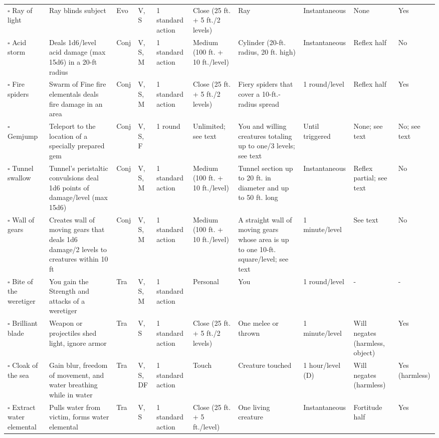 \documentclass[12pt, a4paper]{article}
\begin{document}
\begin{center}
\begin{longtable}[H]{ p{8em} p{15em} p{2em} p{5em} p{6em} p{6em} p{10em} p{6em} p{5em} p{2em} }
    \(\square\) Ray of light & Ray blinds subject & Evo & V, S & 1 standard action & Close (25 ft. + 5 ft./2 levels) & Ray & Instantaneous & None & Yes\\
    \(\square\) Acid storm & Deals 1d6/level acid damage (max 15d6) in a 20-ft radius & Conj & V, S, M & 1 standard action & Medium (100 ft. + 10 ft./level) & Cylinder (20-ft. radius, 20 ft. high) & Instantaneous & Reﬂex half & No\\
    \(\square\) Fire spiders & Swarm of Fine ﬁre elementals deals ﬁre damage in an area & Conj & V, S, M & 1 standard action & Close (25 ft. + 5 ft./2 levels) & Fiery spiders that cover a 10-ft.-radius spread & 1 round/level & Reﬂex half & Yes\\
    \(\square\) Gemjump & Teleport to the location of a specially prepared gem & Conj & V, S, F & 1 round & Unlimited; see text & You and willing creatures totaling up to one/3 levels; see text & Until triggered & None; see text & No; see text\\
    \(\square\) Tunnel swallow & Tunnel’s peristaltic convulsions deal 1d6 points of damage/level (max 15d6) & Conj & V, S, M & 1 standard action & Medium (100 ft. + 10 ft./level) & Tunnel section up to 20 ft. in diameter and up to 50 ft. long & Instantaneous & Reﬂex partial; see text & No\\
    \(\square\) Wall of gears & Creates wall of moving gears that deals 1d6 damage/2 levels to creatures within 10 ft & Conj & V, S, M & 1 standard action & Medium (100 ft. + 10 ft./level) & A straight wall of moving gears whose area is up to one 10-ft. square/level; see text & 1 minute/level & See text & No\\
    \(\square\) Bite of the weretiger & You gain the Strength and attacks of a weretiger & Tra & V, S, M & 1 standard action & Personal & You & 1 round/level & - & -\\
    \(\square\) Brilliant blade & Weapon or projectiles shed light, ignore armor & Tra & V, S & 1 standard action & Close (25 ft. + 5 ft./2 levels) & One melee or thrown  & 1 minute/level & Will negates (harmless, object) & Yes \\
    \(\square\) Cloak of the sea & Gain blur, freedom of movement, and water breathing while in water & Tra & V, S, DF & 1 standard action & Touch & Creature touched & 1 hour/level (D) & Will negates (harmless) & Yes (harmless)\\
    \(\square\) Extract water elemental & Pulls water from victim, forms water elemental & Tra & V, S & 1 standard action & Close (25 ft. + 5 ft./level) & One living creature & Instantaneous & Fortitude half & Yes\\

\end{longtable}
\end{center}
\end{document}
